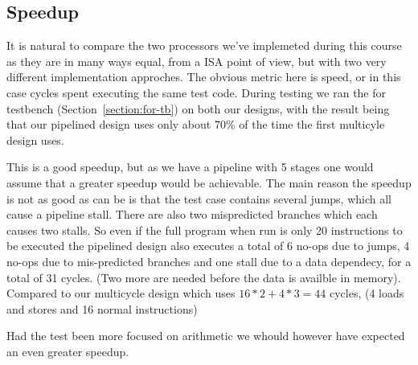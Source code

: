 \subsection{Speedup}

It is natural to compare the two processors we've implemeted during this course
as they are in many ways equal, from a ISA point of view, but with two very different
implementation approches. The obvious metric here is speed, or in this case 
cycles spent executing the same test code. During testing we ran the for testbench 
(Section~\ref{section:for-tb}) on both our designs, with the result being that
our pipelined design uses only about 70\% of the time the first multicyle design
uses. 

This is a good speedup, but as we have a pipeline with 5 stages one would
assume that a greater speedup would be achievable. The main reason the speedup is not as
good as can be is that the test case contains several jumps, which all cause a 
pipeline stall. There are also two mispredicted branches which each causes two
stalls. So even if the full program when run is only 20 instructions to be executed
the pipelined design also executes a total of 6 no-ops due to jumps, 4 no-ops due
to mis-predicted branches and one stall due to a data dependecy, for a total of
31 cycles. (Two more are needed before the data is availble in memory). Compared
to our multicycle design which uses $16*2 + 4*3 = 44$ cycles, (4 loads and stores 
and 16 normal instructions)


Had the test been more focused on arithmetic we whould however have expected an
even greater speedup.